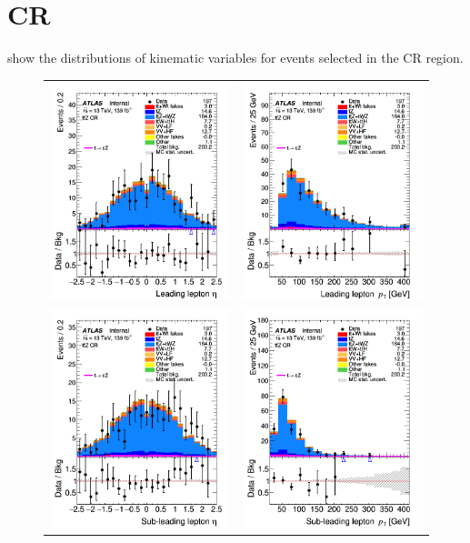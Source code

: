 \clearpage
\FloatBarrier
\section{\ttZ CR}
\label{app:CRs:ttZ}
 show the distributions 
of kinematic variables for events selected in the \ttZ CR region.

\begin{figure}[!htbp]
	\centering
	\begin{tabular}{cc}
		\includegraphics[width=.32\textwidth]{Appendices/AP6/figures/TTZCR/lep1_eta} &
		\includegraphics[width=.32\textwidth]{Appendices/AP6/figures/TTZCR/lep1_pt} \\
		\includegraphics[width=.32\textwidth]{Appendices/AP6/figures/TTZCR/lep2_eta} &
		\includegraphics[width=.32\textwidth]{Appendices/AP6/figures/TTZCR/lep2_pt} \\

\end{tabular}
\end{figure}
